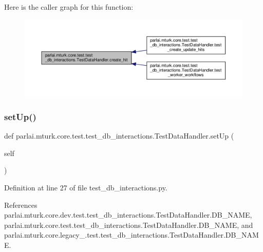 Here is the caller graph for this function\+:
\nopagebreak
\begin{figure}[H]
\begin{center}
\leavevmode
\includegraphics[width=350pt]{classparlai_1_1mturk_1_1core_1_1test_1_1test__db__interactions_1_1TestDataHandler_a7afbef0465fe007d9dccaabd8183d56f_icgraph}
\end{center}
\end{figure}
\mbox{\label{classparlai_1_1mturk_1_1core_1_1test_1_1test__db__interactions_1_1TestDataHandler_a9c1badb44d84077d1a5700aa0c51fdb8}} 
\subsubsection{\texorpdfstring{set\+Up()}{setUp()}}
{\footnotesize\ttfamily def parlai.\+mturk.\+core.\+test.\+test\+\_\+db\+\_\+interactions.\+Test\+Data\+Handler.\+set\+Up (\begin{DoxyParamCaption}\item[{}]{self }\end{DoxyParamCaption})}



Definition at line 27 of file test\+\_\+db\+\_\+interactions.\+py.



References parlai.\+mturk.\+core.\+dev.\+test.\+test\+\_\+db\+\_\+interactions.\+Test\+Data\+Handler.\+D\+B\+\_\+\+N\+A\+ME, parlai.\+mturk.\+core.\+test.\+test\+\_\+db\+\_\+interactions.\+Test\+Data\+Handler.\+D\+B\+\_\+\+N\+A\+ME, and parlai.\+mturk.\+core.\+legacy\+\_.\+test.\+test\+\_\+db\+\_\+interactions.\+Test\+Data\+Handler.\+D\+B\+\_\+\+N\+A\+ME.

